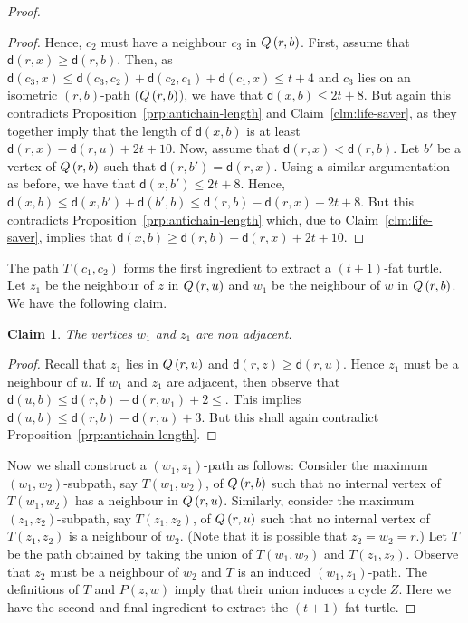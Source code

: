 \documentclass[a4paper]{article}
\newcommand{\dist}[2]{\mathsf{d}\left(#1,#2\right)}
\newcommand{\Pnote}[2]{P\left(#1,#2\right)}
\newtheorem{claim}{Claim}[theorem]
\newcommand{\dd}[1]{\textcolor{red}{#1}}
\begin{document}
\begin{proof}
\begin{proof}
 Hence, $c_2$ must have a neighbour $c_3$ in $Q\left({r},{b}\right)$. First, assume that $\dist{r}{x} \geq \dist{r}{b}$. Then, as $\dist{c_3}{x} \leq \dist{c_3}{c_2} + \dist{c_2}{c_1} + \dist{c_1}{x} \leq t+4$ and $c_3$ lies on an isometric $(r,b)$-path ($Q\left({r},{b}\right)$), we have that $\dist{x}{b} \leq 2t+8$. But {again} this contradicts  Proposition~\ref{prp:antichain-length} and Claim~\ref{clm:life-saver}, as they together imply that the length of $\dist{x}{b}$ is at least $\dist{r}{x} - \dist{r}{u} + 2t+10$. Now, assume that $\dist{r}{x} < \dist{r}{b}$. Let $b'$ be a vertex of $Q\left({r},{b}\right)$ such that $\dist{r}{b'} = \dist{r}{x}$. Using a similar argumentation as before, we have that $\dist{x}{b'} \leq 2t+8$. Hence, $\dist{x}{b} \leq \dist{x}{b'} + \dist{b'}{b} \leq \dist{r}{b} - \dist{r}{x} + 2t+8$.
 But this contradicts Proposition~\ref{prp:antichain-length} which, due to Claim~\ref{clm:life-saver}, implies that $\dist{x}{b} \geq \dist{r}{b} - \dist{r}{x} + 2t+10$.
 \end{proof}

The path $T(c_1,c_2)$ forms the first ingredient to extract a $(t+1)$-fat turtle. Let $z_1$ be the neighbour of $z$ in $Q\left({r},{u}\right)$ and $w_1$ be the neighbour of $w$ in $Q\left({r},{b}\right)$. We have the following claim.

\begin{claim}\label{clm:final}
The vertices $w_1$ and $z_1$ are non adjacent.
\end{claim}

 \begin{proof}
 Recall that $z_1$ lies in $Q\left({r},{u}\right)$ and $\dist{r}{z} \geq \dist{r}{u}$. Hence $z_1$ must be a neighbour of $u$. If $w_1$ and $z_1$ are adjacent, then observe that $\dist{u}{b} \leq \dist{r}{b} - \dist{r}{w_1} + 2 \leq $. This implies $\dist{u}{b} \leq \dist{r}{b} - \dist{r}{u} + 3$. But this shall again contradict Proposition~\ref{prp:antichain-length}.
 \end{proof}

Now we shall construct a $(w_1,z_1)$-path as follows: Consider the maximum $(w_1,w_2)$-subpath, say $T(w_1,w_2)$, of $Q\left({r},{b}\right)$ such that no internal vertex of $T(w_1,w_2)$ has a neighbour in $Q\left({r},{u}\right)$. Similarly, consider the maximum $(z_1,z_2)$-subpath, say $T(z_1,z_2)$, of $Q\left({r},{u}\right)$ such that no internal vertex of $T(z_1,z_2)$ is a neighbour of $w_2$. {(Note that it is possible that $z_2=w_2=r$.)}
Let $T$ be the path obtained by taking the union of $T(w_1,w_2)$ and $T(z_1,z_2)$. Observe that $z_2$ must be a neighbour of $w_2$ and $T$ is an induced $(w_1,z_1)$-path. The definitions of $T$ and $\Pnote{z}{w}$ imply that their union induces a cycle $Z$. Here we have the second and final ingredient to extract the $(t+1)$-fat turtle.


\end{proof}
\end{document}
